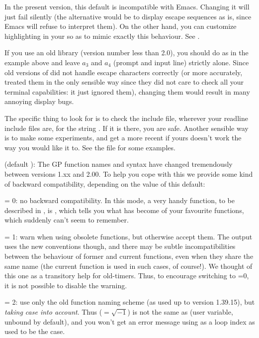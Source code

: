 \emacs In the present version, this default is incompatible with Emacs.
Changing it will just fail silently (the alternative would be to display
escape sequences as is, since Emacs will refuse to interpret them). On the
other hand, you can customize highlighting in your  so as to mimic
exactly this behaviour. See .

If you use an old  library (version number less than 2.0),
you should do as in the example above and leave $a_3$ and $a_4$ (prompt
and input line) strictly alone. Since old versions of  did
not handle escape characters correctly (or more accurately, treated them
in the only sensible way since they did not care to check all your terminal
capabilities: it just ignored them), changing them would result in many
annoying display bugs.

The specific thing to look for is to check the  include
file, wherever your readline include files are, for the string
. If it is there, you are safe. Another
sensible way is to make some experiments, and get a more recent
 if yours doesn't work the way you would like it to. See
the file  for some examples.

 (default ): The GP function names and syntax
have changed tremendously between versions 1.xx and 2.00. To help you cope
with this we provide some kind of backward compatibility, depending on the
value of this default:

\quad {} = 0: no backward compatibility. In this mode, a very
handy function, to be described in , is ,
which tells you what has become of your favourite functions, which 
suddenly can't seem to remember.

\quad {} = 1: warn when using obsolete functions, but
otherwise accept them. The output uses the new conventions though, and
there may be subtle incompatibilities between the behaviour of former and
current functions, even when they share the same name (the current function
is used in such cases, of course!). We thought of this one as a transitory
help for  old-timers. Thus, to encourage switching to =0,
it is not possible to disable the warning.

\quad {} = 2: use only the old function naming scheme (as
used up to version 1.39.15), but \emph{taking case into account}. Thus
 (${}=\sqrt{-1}$) is not the same as  (user variable, unbound
by default), and you won't get an error message using  as a loop
index as used to be the case.

